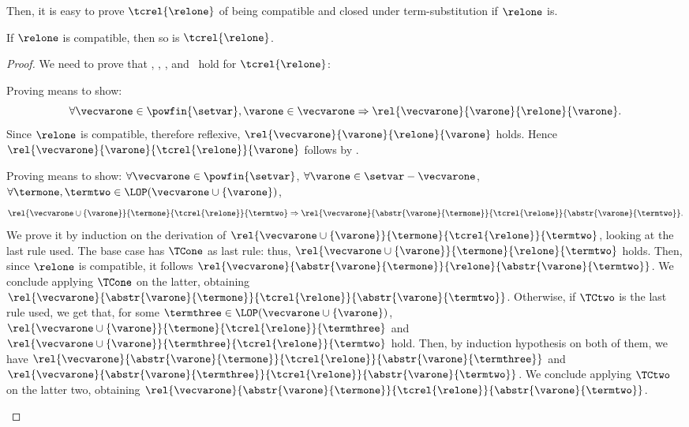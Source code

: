 Then, it is easy to prove $\tcrel{\relone}$ of being compatible and closed
under term-substitution if $\relone$ is.  
\begin{lemma}\label{lemma:tcrelCom}
  If $\relone$ is compatible, then so is $\tcrel{\relone}$.
\end{lemma}
\begin{proof}
  We need to prove that \Comone, \Comtwo, \Comthree, and \Comfour\ hold for
  $\tcrel{\relone}$:
  \begin{varitemize}
  \item Proving \Comone{} means to show:
    $$
    \forall\vecvarone\in\powfin{\setvar}, \varone\in\vecvarone\Rightarrow
    \rel{\vecvarone}{\varone}{\relone}{\varone}.
    $$
    Since $\relone$ is compatible, therefore reflexive,
    $\rel{\vecvarone}{\varone}{\relone}{\varone}$ holds. Hence
    $\rel{\vecvarone}{\varone}{\tcrel{\relone}}{\varone}$ follows by
    \TCone.
  \item Proving \Comtwo{} means to show:
    $\forall\vecvarone\in\powfin{\setvar}$,
    $\forall\varone\in\setvar-\vecvarone$, $\forall\termone,
    \termtwo\in\LOP(\vecvarone\cup\{\varone\})$,
    $$
    \rel{\vecvarone\cup\{\varone\}}{\termone}{\tcrel{\relone}}{\termtwo}\Rightarrow
    \rel{\vecvarone}{\abstr{\varone}{\termone}}{\tcrel{\relone}}{\abstr{\varone}{\termtwo}}.
    $$
    We prove it by induction on the derivation of
    $\rel{\vecvarone\cup\{\varone\}}{\termone}{\tcrel{\relone}}{\termtwo}$,
    looking at the last rule used. The base case has $\TCone$ as last rule:
    thus, $\rel{\vecvarone\cup\{\varone\}}{\termone}{\relone}{\termtwo}$
    holds. Then, since $\relone$ is compatible, it follows
    $\rel{\vecvarone}{\abstr{\varone}{\termone}}{\relone}{\abstr{\varone}{\termtwo}}$. We
    conclude applying $\TCone$ on the latter, obtaining
    $\rel{\vecvarone}{\abstr{\varone}{\termone}}{\tcrel{\relone}}{\abstr{\varone}{\termtwo}}$. Otherwise,
    if $\TCtwo$ is the last rule used, we get that, for some
    $\termthree\in\LOP(\vecvarone\cup\{\varone\})$,
    $\rel{\vecvarone\cup\{\varone\}}{\termone}{\tcrel{\relone}}{\termthree}$
    and
    $\rel{\vecvarone\cup\{\varone\}}{\termthree}{\tcrel{\relone}}{\termtwo}$
    hold. Then, by induction hypothesis on both of them, we have
    $\rel{\vecvarone}{\abstr{\varone}{\termone}}{\tcrel{\relone}}{\abstr{\varone}{\termthree}}$
    and
    $\rel{\vecvarone}{\abstr{\varone}{\termthree}}{\tcrel{\relone}}{\abstr{\varone}{\termtwo}}$. We
    conclude applying $\TCtwo$ on the latter two, obtaining
    $\rel{\vecvarone}{\abstr{\varone}{\termone}}{\tcrel{\relone}}{\abstr{\varone}{\termtwo}}$.

\end{varitemize}
\end{proof}
